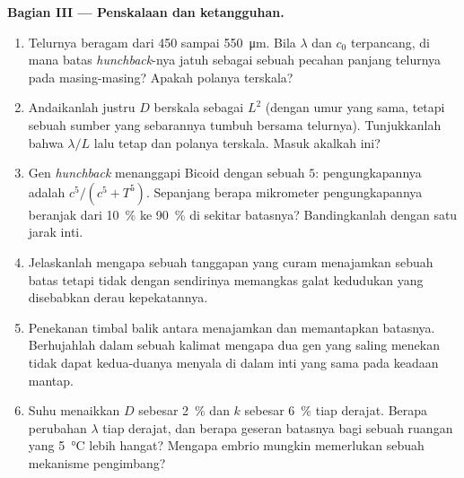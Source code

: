 \begin{problem}
\medskip
\noindent\textbf{Bagian III --- Penskalaan dan ketangguhan.}
\begin{enumerate}[resume]
  \item Telurnya beragam dari \qty{450}{} sampai \qty{550}{\micro m}. Bila $\lambda$
        dan $c_{0}$ terpancang, di mana batas \emph{hunchback}-nya
        jatuh sebagai sebuah pecahan panjang telurnya pada masing-masing? Apakah polanya terskala?
  \item Andaikanlah justru $D$ berskala sebagai $L^{2}$ (dengan umur yang sama,
        tetapi sebuah sumber yang sebarannya tumbuh bersama telurnya). Tunjukkanlah bahwa
        $\lambda/L$ lalu tetap dan polanya terskala. Masuk akalkah ini?
  \item Gen \emph{hunchback} menanggapi Bicoid dengan sebuah  $5$: pengungkapannya adalah $c^{5}/(c^{5} + T^{5})$.
        Sepanjang berapa mikrometer pengungkapannya beranjak dari \qty{10}{\%}
        ke \qty{90}{\%} di sekitar batasnya? Bandingkanlah dengan satu jarak inti.
  \item Jelaskanlah mengapa sebuah tanggapan yang curam menajamkan sebuah batas tetapi tidak
        dengan sendirinya memangkas galat kedudukan yang disebabkan derau
        kepekatannya.
  \item Penekanan timbal balik antara  menajamkan dan memantapkan
        batasnya. Berhujahlah dalam sebuah kalimat mengapa dua gen yang saling menekan
        tidak dapat kedua-duanya menyala di dalam inti yang sama pada keadaan
        mantap.
  \item Suhu menaikkan $D$ sebesar \qty{2}{\%} dan $k$ sebesar \qty{6}{\%} tiap
        derajat. Berapa perubahan $\lambda$ tiap derajat, dan berapa geseran batasnya
        bagi sebuah ruangan yang \qty{5}{\celsius} lebih hangat? Mengapa embrio mungkin memerlukan sebuah
        mekanisme pengimbang?
\end{enumerate}


\end{problem}
